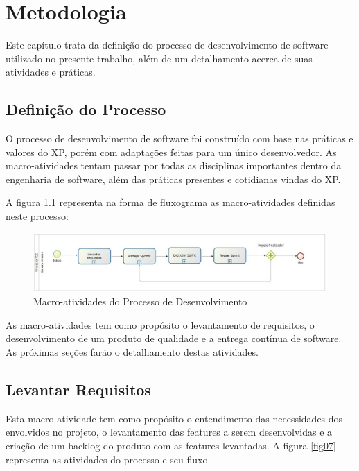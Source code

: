 \chapter[Metodologia]{Metodologia}

Este capítulo trata da definição do processo de desenvolvimento de software utilizado no presente trabalho, além de um detalhamento acerca de suas atividades e práticas.

\section{Definição do Processo}

O processo de desenvolvimento de software foi construído com base nas práticas e valores do XP, porém com adaptações feitas para um único desenvolvedor. As macro-atividades tentam passar por todas as disciplinas importantes dentro da engenharia de software, além das práticas presentes e cotidianas vindas do XP.

A figura \ref{fig06} representa na forma de fluxograma as macro-atividades definidas neste processo:

\begin{figure}[ht]
	\centering
	\includegraphics[keepaspectratio=true,scale=0.9, width=\textwidth]{figuras/fig06.eps}
	\caption{Macro-atividades do Processo de Desenvolvimento}
	\label{fig06}
\end{figure}

As macro-atividades tem como propósito o levantamento de requisitos, o desenvolvimento de um produto de qualidade e a entrega contínua de software. As próximas seções farão o detalhamento destas atividades.

\section{Levantar Requisitos}

Esta macro-atividade tem como propósito o entendimento das necessidades dos envolvidos no projeto, o levantamento das features a serem desenvolvidas e a criação de um backlog do produto com as features levantadas. A figura \ref{fig07} representa as atividades do processo e seu fluxo.

